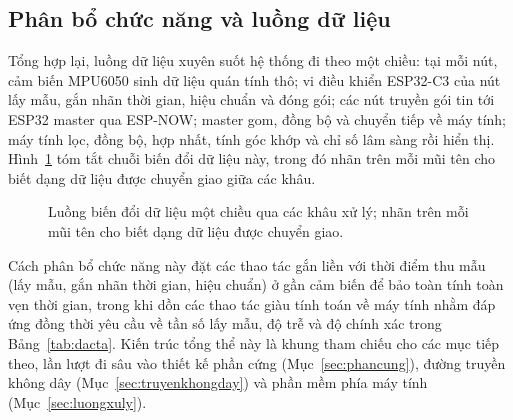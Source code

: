 \documentclass[../DoAn.tex]{subfiles}
\begin{document}
\subsection{Phân bổ chức năng và luồng dữ liệu}
\label{subsec:kt_luong}
Tổng hợp lại, luồng dữ liệu xuyên suốt hệ thống đi theo một chiều: tại mỗi nút,
cảm biến MPU6050 sinh dữ liệu quán tính thô; vi điều khiển ESP32-C3 của nút lấy
mẫu, gắn nhãn thời gian, hiệu chuẩn và đóng gói; các nút truyền gói tin tới ESP32
master qua ESP-NOW; master gom, đồng bộ và chuyển tiếp về máy tính; máy tính lọc,
đồng bộ, hợp nhất, tính góc khớp và chỉ số lâm sàng rồi hiển thị.
Hình~\ref{fig:luongdulieu} tóm tắt chuỗi biến đổi dữ liệu này, trong đó nhãn trên
mỗi mũi tên cho biết dạng dữ liệu được chuyển giao giữa các khâu.

\begin{figure}[h]
    \centering
    \caption{Luồng biến đổi dữ liệu một chiều qua các khâu xử lý; nhãn trên mỗi mũi tên cho biết dạng dữ liệu được chuyển giao.}
    \label{fig:luongdulieu}
\end{figure}

Cách
phân bổ chức năng này đặt các thao tác gắn liền với thời điểm thu mẫu (lấy mẫu,
gắn nhãn thời gian, hiệu chuẩn) ở gần cảm biến để bảo toàn tính toàn vẹn thời
gian, trong khi dồn các thao tác giàu tính toán về máy tính nhằm đáp ứng đồng thời
yêu cầu về tần số lấy mẫu, độ trễ và độ chính xác trong Bảng~\ref{tab:dacta}. Kiến
trúc tổng thể này là khung tham chiếu cho các mục tiếp theo, lần lượt đi sâu vào
thiết kế phần cứng (Mục~\ref{sec:phancung}), đường truyền không dây (Mục~\ref{sec:truyenkhongday})
và phần mềm phía máy tính (Mục~\ref{sec:luongxuly}).
\end{document}
